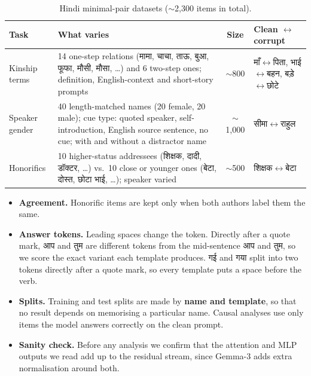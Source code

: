 \documentclass[11pt,a4paper]{article}
\newcommand{\hi}[1]{{\devfont #1}}
\begin{document}
\begin{table}[H]
\centering
\small
\begin{tabularx}{\textwidth}{@{}l Y c >{\raggedright\arraybackslash}p{2.7cm}@{}}
\toprule
\textbf{Task} & \textbf{What varies} & \textbf{Size} & \textbf{Clean $\leftrightarrow$ corrupt} \\
\midrule
Kinship terms & 14 one-step relations (\hi{मामा, चाचा, ताऊ, बुआ, फूफा, मौसी, मौसा}, \dots) and 6 two-step ones; definition, English-context and short-story prompts & $\sim$800 & \hi{माँ}$\leftrightarrow$\hi{पिता}, \hi{भाई}$\leftrightarrow$\hi{बहन}, \hi{बड़े}$\leftrightarrow$\hi{छोटे} \\[2pt]
Speaker gender & 40 length-matched names (20 female, 20 male); cue type: quoted speaker, self-introduction, English source sentence, no cue; with and without a distractor name & $\sim$1,000 & \hi{सीमा}$\leftrightarrow$\hi{राहुल} \\[2pt]
Honorifics & 10 higher-status addressees (\hi{शिक्षक, दादी, डॉक्टर}, \dots) vs.\ 10 close or younger ones (\hi{बेटा, दोस्त, छोटा भाई}, \dots); speaker varied & $\sim$500 & \hi{शिक्षक}$\leftrightarrow$\hi{बेटा} \\
\bottomrule
\end{tabularx}
\caption{Hindi minimal-pair datasets ($\sim$2,300 items in total).}
\label{tab:data}
\end{table}

\begin{itemize}
  \item \textbf{Agreement.} Honorific items are kept only when both authors label them the same.
  \item \textbf{Answer tokens.} Leading spaces change the token. Directly after a quote mark, \hi{आप} and \hi{तुम} are different tokens from the mid-sentence \texttt{\textvisiblespace}\hi{आप} and \texttt{\textvisiblespace}\hi{तुम}, so we score the exact variant each template produces. \hi{गई} and \hi{गया} split into two tokens directly after a quote mark, so every template puts a space before the verb.
  \item \textbf{Splits.} Training and test splits are made by \textbf{name and template}, so that no result depends on memorising a particular name. Causal analyses use only items the model answers correctly on the clean prompt.
  \item \textbf{Sanity check.} Before any analysis we confirm that the attention and MLP outputs we read add up to the residual stream, since Gemma-3 adds extra normalisation around both.
\end{itemize}
\end{document}
